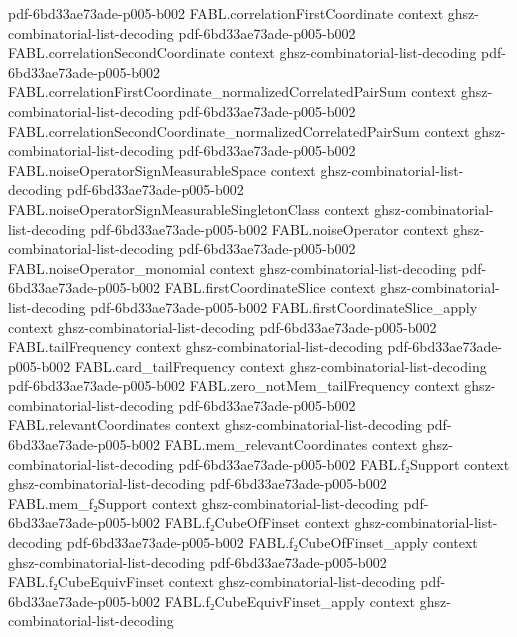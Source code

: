 \begin{theorem}
  {pdf-6bd33ae73ade-p005-b002}
\proofstep
  {FABL.correlationFirstCoordinate}
  {context}
  {ghsz-combinatorial-list-decoding}
  {pdf-6bd33ae73ade-p005-b002}
\proofstep
  {FABL.correlationSecondCoordinate}
  {context}
  {ghsz-combinatorial-list-decoding}
  {pdf-6bd33ae73ade-p005-b002}
\proofstep
  {FABL.correlationFirstCoordinate_normalizedCorrelatedPairSum}
  {context}
  {ghsz-combinatorial-list-decoding}
  {pdf-6bd33ae73ade-p005-b002}
\proofstep
  {FABL.correlationSecondCoordinate_normalizedCorrelatedPairSum}
  {context}
  {ghsz-combinatorial-list-decoding}
  {pdf-6bd33ae73ade-p005-b002}
\proofstep
  {FABL.noiseOperatorSignMeasurableSpace}
  {context}
  {ghsz-combinatorial-list-decoding}
  {pdf-6bd33ae73ade-p005-b002}
\proofstep
  {FABL.noiseOperatorSignMeasurableSingletonClass}
  {context}
  {ghsz-combinatorial-list-decoding}
  {pdf-6bd33ae73ade-p005-b002}
\proofstep
  {FABL.noiseOperator}
  {context}
  {ghsz-combinatorial-list-decoding}
  {pdf-6bd33ae73ade-p005-b002}
\proofstep
  {FABL.noiseOperator_monomial}
  {context}
  {ghsz-combinatorial-list-decoding}
  {pdf-6bd33ae73ade-p005-b002}
\proofstep
  {FABL.firstCoordinateSlice}
  {context}
  {ghsz-combinatorial-list-decoding}
  {pdf-6bd33ae73ade-p005-b002}
\proofstep
  {FABL.firstCoordinateSlice_apply}
  {context}
  {ghsz-combinatorial-list-decoding}
  {pdf-6bd33ae73ade-p005-b002}
\proofstep
  {FABL.tailFrequency}
  {context}
  {ghsz-combinatorial-list-decoding}
  {pdf-6bd33ae73ade-p005-b002}
\proofstep
  {FABL.card_tailFrequency}
  {context}
  {ghsz-combinatorial-list-decoding}
  {pdf-6bd33ae73ade-p005-b002}
\proofstep
  {FABL.zero_notMem_tailFrequency}
  {context}
  {ghsz-combinatorial-list-decoding}
  {pdf-6bd33ae73ade-p005-b002}
\proofstep
  {FABL.relevantCoordinates}
  {context}
  {ghsz-combinatorial-list-decoding}
  {pdf-6bd33ae73ade-p005-b002}
\proofstep
  {FABL.mem_relevantCoordinates}
  {context}
  {ghsz-combinatorial-list-decoding}
  {pdf-6bd33ae73ade-p005-b002}
\proofstep
  {FABL.f₂Support}
  {context}
  {ghsz-combinatorial-list-decoding}
  {pdf-6bd33ae73ade-p005-b002}
\proofstep
  {FABL.mem_f₂Support}
  {context}
  {ghsz-combinatorial-list-decoding}
  {pdf-6bd33ae73ade-p005-b002}
\proofstep
  {FABL.f₂CubeOfFinset}
  {context}
  {ghsz-combinatorial-list-decoding}
  {pdf-6bd33ae73ade-p005-b002}
\proofstep
  {FABL.f₂CubeOfFinset_apply}
  {context}
  {ghsz-combinatorial-list-decoding}
  {pdf-6bd33ae73ade-p005-b002}
\proofstep
  {FABL.f₂CubeEquivFinset}
  {context}
  {ghsz-combinatorial-list-decoding}
  {pdf-6bd33ae73ade-p005-b002}
\proofstep
  {FABL.f₂CubeEquivFinset_apply}
  {context}
  {ghsz-combinatorial-list-decoding}

\end{theorem}
